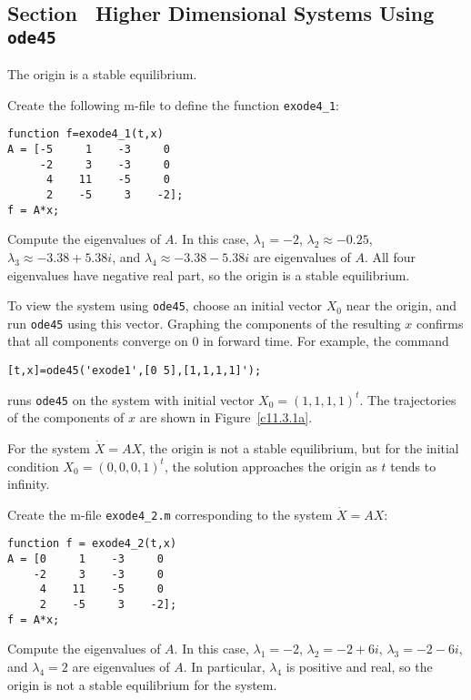 \subsection*{Section~\protect{\ref{S:ode45HD}} Higher Dimensional Systems Using 
{\tt ode45}}

\ans The origin is a stable equilibrium.

\soln Create the following m-file to define the function {\tt exode4\_1}:
\begin{verbatim}
function f=exode4_1(t,x)
A = [-5     1    -3     0
     -2     3    -3     0
      4    11    -5     0
      2    -5     3    -2];
f = A*x;
\end{verbatim}
Compute the eigenvalues of $A$.  In this case, $\lambda_1 = -2$, $\lambda_2
\approx -0.25$, $\lambda_3 \approx -3.38 + 5.38i$, and $\lambda_4 \approx
-3.38 - 5.38i$ are eigenvalues of $A$.  All four eigenvalues have negative
real part, so the origin is a stable equilibrium.

\para To view the system using {\tt ode45}, choose an initial vector $X_0$
near the origin, and run {\tt ode45} using this vector.  Graphing the
components of the resulting $x$ confirms that all components converge on $0$
in forward time.  For example, the command
\begin{verbatim}
[t,x]=ode45('exode1',[0 5],[1,1,1,1]');
\end{verbatim}
runs {\tt ode45} on the system with initial vector $X_0 = (1,1,1,1)^t$.
The trajectories of the components of $x$ are shown in Figure~\ref{c11.3.1a}.

\begin{figure}[htb]
                       \centerline{%
                       }
\end{figure}

\ans For the system $\dot{X} = AX$, the origin is not a stable
equilibrium, but for the initial condition $X_0 = (0,0,0,1)^t$, the
solution approaches the origin as $t$ tends to infinity.

\soln Create the m-file {\tt exode4\_2.m} corresponding to the system 
$\dot{X} = AX$:
\begin{verbatim}
function f = exode4_2(t,x)
A = [0     1    -3     0
    -2     3    -3     0
     4    11    -5     0
     2    -5     3    -2];
f = A*x;
\end{verbatim}
Compute the eigenvalues of $A$.  In this case, $\lambda_1 = -2$, $\lambda_2
= -2 + 6i$, $\lambda_3 = -2 - 6i$, and $\lambda_4 = 2$ are eigenvalues of
$A$.  In particular, $\lambda_4$ is positive and real, so the origin is not
a stable equilibrium for the system.

